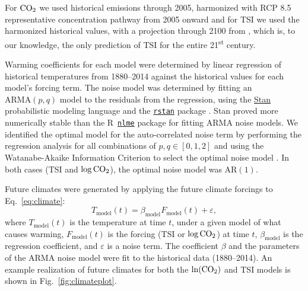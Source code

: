 \documentclass{article}\usepackage[]{graphicx}\usepackage[]{color}
\newcommand{\Rstat}{\textsf{R}}
\newcommand{\ARMA}{\text{ARMA}}
\newcommand{\AR}{\text{AR}}
\begin{document}
For $\ce{CO2}$ we used historical emissions through 2005, harmonized with RCP 8.5 representative concentration pathway from 2005 onward  and for TSI we used the harmonized historical values, with a projection through 2100 from , which is, to our knowledge, the only prediction of TSI for the entire 21\textsuperscript{st} century.

Warming coefficients for each model were determined by linear regression of historical temperatures from 1880--2014 against the historical values for each model's forcing term. The noise model was determined by fitting an $\ARMA(p,q)$ model to the residuals from the regression, using the \href{http://mc-stan.org}{Stan} probabilistic modeling language and the \href{https://cran.r-project.org/web/packages/rstan/}{\texttt{rstan}} package . Stan proved more numerically stable than the \Rstat\ \href{http://CRAN.R-project.org/package=nlme}{\texttt{nlme}} package  for fitting ARMA noise models. We identified the optimal model for the auto-correlated noise term by performing the regression analysis for all combinations of $p, q \in [0,1,2]$ and using the Watanabe-Akaike Information Criterion to select the optimal noise model . In both cases (TSI and $\log\ce{CO2}$), the optimal noise model was $\AR(1)$.

Future climates were generated by applying the future climate forcings to Eq.~\ref{eq:climate}:
\begin{equation}
T_{\text{model}}(t) = \beta_{\text{model}} F_{\text{model}}(t) + \varepsilon,
\label{eq:climate}
\end{equation}
where $T_{\text{model}}(t)$ is the temperature at time $t$, under a given model of what causes warming,
$F_{\text{model}}(t)$ is the forcing (TSI or $\log\ce{CO2}$) at time $t$,
$\beta_{\text{model}}$ is the regression coefficient, and
$\varepsilon$ is a noise term.
The coefficient $\beta$ and the parameters of the ARMA noise model were fit to the historical data (1880--2014).
An example realization of future climates for both the $\ln(\ce{CO2})$ and TSI models is shown in Fig.~\ref{fig:climateplot}.
\end{document}
